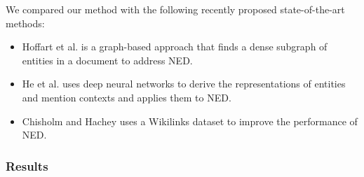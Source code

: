 \documentclass[11pt,letterpaper]{article}
\begin{document}
We compared our method with the following recently proposed state-of-the-art methods:
\begin{itemize}[itemsep=0em,topsep=0.3em]
\item Hoffart et al. \cite{Hoffart2011} is a graph-based approach that finds a dense subgraph of entities in a document to address NED.
\item He et al. \cite{he-EtAl:2013:Short} uses deep neural networks to derive the representations of entities and mention contexts and applies them to NED.
\item Chisholm and Hachey \cite{TACL494} uses a Wikilinks dataset \cite{singh12:wiki-links} to improve the performance of NED.
\end{itemize}
\subsubsection{Results}
\end{document}
